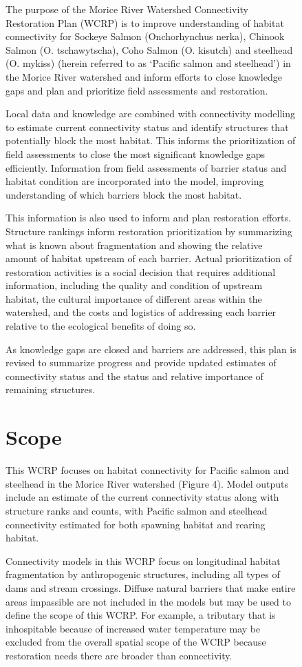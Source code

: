 \documentclass[
  letterpaper,
  DIV=11,
  numbers=noendperiod]{scrreprt}
\begin{document}
\begin{figure}
{The purpose of the Morice River Watershed Connectivity Restoration Plan
(WCRP) is to improve understanding of habitat connectivity for Sockeye
Salmon (Onchorhynchus nerka), Chinook Salmon (O. tschawytscha), Coho
Salmon (O. kisutch) and steelhead (O. mykiss) (herein referred to as
`Pacific salmon and steelhead') in the Morice River watershed and inform
efforts to close knowledge gaps and plan and prioritize field
assessments and restoration.

Local data and knowledge are combined with connectivity modelling to
estimate current connectivity status and identify structures that
potentially block the most habitat. This informs the prioritization of
field assessments to close the most significant knowledge gaps
efficiently. Information from field assessments of barrier status and
habitat condition are incorporated into the model, improving
understanding of which barriers block the most habitat.

This information is also used to inform and plan restoration efforts.
Structure rankings inform restoration prioritization by summarizing what
is known about fragmentation and showing the relative amount of habitat
upstream of each barrier. Actual prioritization of restoration
activities is a social decision that requires additional information,
including the quality and condition of upstream habitat, the cultural
importance of different areas within the watershed, and the costs and
logistics of addressing each barrier relative to the ecological benefits
of doing so.

As knowledge gaps are closed and barriers are addressed, this plan is
revised to summarize progress and provide updated estimates of
connectivity status and the status and relative importance of remaining
structures.

\section*{Scope}\label{scope}


This WCRP focuses on habitat connectivity for Pacific salmon and
steelhead in the Morice River watershed (Figure 4). Model outputs
include an estimate of the current connectivity status along with
structure ranks and counts, with Pacific salmon and steelhead
connectivity estimated for both spawning habitat and rearing habitat.

Connectivity models in this WCRP focus on longitudinal habitat
fragmentation by anthropogenic structures, including all types of dams
and stream crossings. Diffuse natural barriers that make entire areas
impassible are not included in the models but may be used to define the
scope of this WCRP. For example, a tributary that is inhospitable
because of increased water temperature may be excluded from the overall
spatial scope of the WCRP because restoration needs there are broader
than connectivity.

}
\end{figure}
\end{document}
